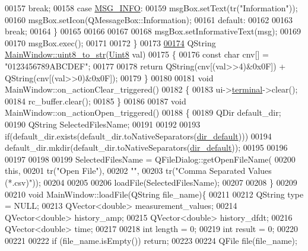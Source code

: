 \begin{DoxyCode}
00157         \textcolor{keywordflow}{break};
00158     \textcolor{keywordflow}{case} \hyperlink{a00034_a1ddcc97224a95cec04b38b0ac866fa19}{MSG\_INFO}:
00159         msgBox.setText(tr(\textcolor{stringliteral}{"Information"}));
00160         msgBox.setIcon(QMessageBox::Information);
00161     \textcolor{keywordflow}{default}:
00162 
00163         \textcolor{keywordflow}{break};
00164     \}
00165 
00166 
00167 
00168  msgBox.setInformativeText(msg);
00169 
00170  msgBox.exec();
00171 
00172 \}
00173 
\hypertarget{a00038_source_l00174}{}\hyperlink{a00006_a8821556476f5a88c107f21d7db14e49c}{00174} QString \hyperlink{a00006_a8821556476f5a88c107f21d7db14e49c}{MainWindow::uint8\_to\_str}(\hyperlink{a00001_a979e3e23b9a449e69ab6a8a83b6042f8}{Uint8} val)
00175 \{
00176     \textcolor{keyword}{const} \textcolor{keywordtype}{char} cnv[] = \textcolor{stringliteral}{"0123456789ABCDEF"};
00177 
00178     \textcolor{keywordflow}{return} QString(cnv[(val>>4)&0x0F]) + QString(cnv[(val>>0)&0x0F]);
00179 \}
00180 
00181 \textcolor{keywordtype}{void} MainWindow::on\_actionClear\_triggered()
00182 \{
00183     ui->\hyperlink{a00027_aae71c46ea4546df5994735dee573b2dd}{terminal}->clear();
00184     rc\_buffer.clear();
00185 \}
00186 
00187 \textcolor{keywordtype}{void} MainWindow::on\_actionOpen\_triggered()
00188 \{
00189     QDir   default\_dir;
00190     QString SelectedFilesName;
00191 
00192 
00193     \textcolor{keywordflow}{if}(default\_dir.exists(default\_dir.toNativeSeparators(\hyperlink{a00006_a2e107e43aeaccaf4c9a42254f13122c8}{dir\_default})))
00194         default\_dir.mkdir(default\_dir.toNativeSeparators(\hyperlink{a00006_a2e107e43aeaccaf4c9a42254f13122c8}{dir\_default}));
00195 
00196 
00197 
00198 
00199     SelectedFilesName = QFileDialog::getOpenFileName(
00200         \textcolor{keyword}{this},
00201         tr(\textcolor{stringliteral}{"Open File"}),
00202         \textcolor{stringliteral}{""},
00203         tr(\textcolor{stringliteral}{"Comma Separated Values (*.csv)"}));
00204 
00205 
00206     loadFile(SelectedFilesName);
00207 
00208 \}
00209 
00210 \textcolor{keywordtype}{void} MainWindow::loadFile(QString file\_name)\{
00211 
00212     QString  type = NULL;
00213     QVector<double> measurement\_values;
00214     QVector<double> history\_amp;
00215     QVector<double> history\_dfdt;
00216     QVector<double> time;
00217 
00218     \textcolor{keywordtype}{int}    length = 0;
00219     \textcolor{keywordtype}{int}    result = 0;
00220 
00221 
00222     \textcolor{keywordflow}{if} (file\_name.isEmpty()) \textcolor{keywordflow}{return};
00223 
00224         QFile file(file\_name);

\end{DoxyCode}
